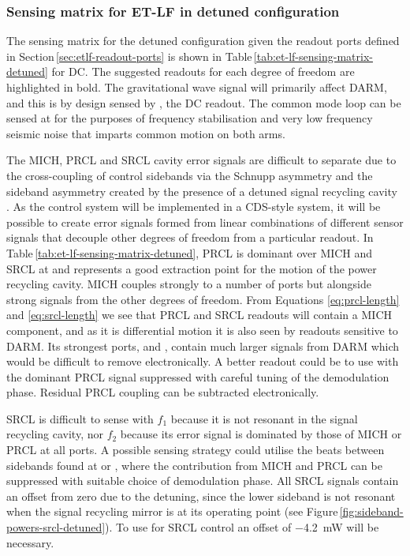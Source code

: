 \subsubsection{Sensing matrix for ET-LF in detuned configuration}
The sensing matrix for the detuned configuration given the readout ports defined in Section\,\ref{sec:etlf-readout-ports} is shown in Table\,\ref{tab:et-lf-sensing-matrix-detuned} for \gls{DC}. The suggested readouts for each degree of freedom are highlighted in bold. The gravitational wave signal will primarily affect \gls{DARM}, and this is by design sensed by \ASDC{}, the \gls{DC} readout. The common mode loop can be sensed at \REFLFIRST{} for the purposes of frequency stabilisation and very low frequency seismic noise that imparts common motion on both arms.

The \gls{MICH}, \gls{PRCL} and \gls{SRCL} cavity error signals are difficult to separate due to the cross-coupling of control sidebands via the Schnupp asymmetry and the sideband asymmetry created by the presence of a detuned signal recycling cavity \cite{Hild2007}. As the control system will be implemented in a \LIGO{} \gls{CDS}-style system, it will be possible to create error signals formed from linear combinations of different sensor signals that decouple other degrees of freedom from a particular readout. In Table\,\ref{tab:et-lf-sensing-matrix-detuned}, \gls{PRCL} is dominant over \gls{MICH} and \gls{SRCL} at \POPFIRST{} and represents a good extraction point for the motion of the power recycling cavity. \gls{MICH} couples strongly to a number of ports but alongside strong signals from the other degrees of freedom. From Equations \ref{eq:prcl-length} and \ref{eq:srcl-length} we see that \gls{PRCL} and \gls{SRCL} readouts will contain a \gls{MICH} component, and as it is differential motion it is also seen by readouts sensitive to \gls{DARM}. Its strongest ports, \ASDC{} and \ASSECOND{}, contain much larger signals from \gls{DARM} which would be difficult to remove electronically. A better readout could be to use \POPSECOND{} with the dominant \gls{PRCL} signal suppressed with careful tuning of the demodulation phase. Residual \gls{PRCL} coupling can be subtracted electronically.

\gls{SRCL} is difficult to sense with $f_1$ because it is not resonant in the signal recycling cavity, nor $f_2$ because its error signal is dominated by those of \gls{MICH} or \gls{PRCL} at all ports. A possible sensing strategy could utilise the beats between sidebands found at \REFLDIFF{} or \REFLSUM{}, where the contribution from \gls{MICH} and \gls{PRCL} can be suppressed with suitable choice of demodulation phase. All \gls{SRCL} signals contain an offset from zero due to the detuning, since the lower sideband is not resonant when the signal recycling mirror is at its operating point (see Figure\,\ref{fig:sideband-powers-srcl-detuned}). To use \REFLSUM{} for \gls{SRCL} control an offset of \SI{-4.2}{\milli\watt} will be necessary.

